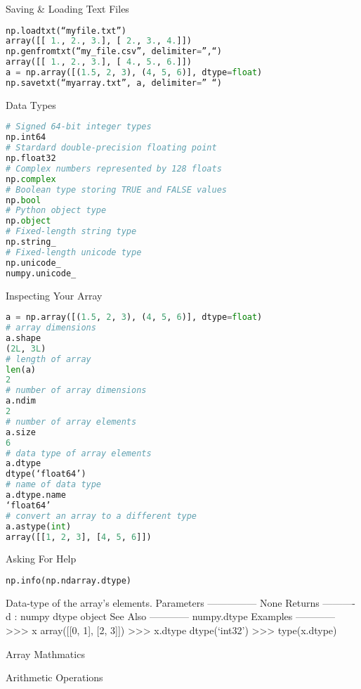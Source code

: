 Saving & Loading Text Files

\begin{lstlisting}[language=Python]
np.loadtxt(“myfile.txt”)
array([[ 1., 2., 3.], [ 2., 3., 4.]])
np.genfromtxt(“my_file.csv”, delimiter=”,“)
array([[ 1., 2., 3.], [ 4., 5., 6.]])
a = np.array([(1.5, 2, 3), (4, 5, 6)], dtype=float)
np.savetxt(“myarray.txt”, a, delimiter=” “)
\end{lstlisting}

Data Types

\begin{lstlisting}[language=Python]
# Signed 64-bit integer types
np.int64
# Stardard double-precision floating point
np.float32
# Complex numbers represented by 128 floats
np.complex
# Boolean type storing TRUE and FALSE values
np.bool
# Python object type
np.object
# Fixed-length string type
np.string_
# Fixed-length unicode type
np.unicode_
numpy.unicode_
\end{lstlisting}

Inspecting Your Array

\begin{lstlisting}[language=Python]
a = np.array([(1.5, 2, 3), (4, 5, 6)], dtype=float)
# array dimensions
a.shape
(2L, 3L)
# length of array
len(a)
2
# number of array dimensions
a.ndim
2
# number of array elements
a.size
6
# data type of array elements
a.dtype
dtype(‘float64’)
# name of data type
a.dtype.name
‘float64’
# convert an array to a different type
a.astype(int)
array([[1, 2, 3], [4, 5, 6]])
\end{lstlisting}

Asking For Help

\begin{lstlisting}[language=Python]
np.info(np.ndarray.dtype)
\end{lstlisting}

Data-type of the array’s elements. Parameters ————— None Returns ———- d : numpy dtype object See Also ———— numpy.dtype Examples ———— >>> x array([[0, 1], [2, 3]]) >>> x.dtype dtype(‘int32’) >>> type(x.dtype)

Array Mathmatics

Arithmetic Operations

